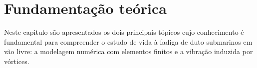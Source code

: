 \chapter{Fundamentação teórica}\label{chap:fundamentacao}

Neste capitulo são apresentados os dois principais tópicos cujo conhecimento é fundamental para compreender o estudo de vida à fadiga de duto submarinos em vão livre: a modelagem numérica com elementos finitos e a vibração induzida por vórtices.


